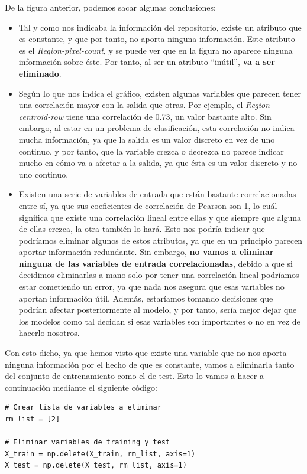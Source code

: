 \documentclass[11pt,a4paper]{article}
\begin{document}
De la figura anterior, podemos sacar algunas conclusiones:

\begin{itemize}[label=\textbullet]
    \item Tal y como nos indicaba la información del repositorio, existe un atributo que es constante, y que por tanto, no aporta
    ninguna información. Este atributo es el \textit{Region-pixel-count}, y se puede ver que en la figura no aparece ninguna
    información sobre éste. Por tanto, al ser un atributo ``inútil'', \textbf{va a ser eliminado}.
    \item Según lo que nos indica el gráfico, existen algunas variables que parecen tener una correlación mayor con la salida que
    otras. Por ejemplo, el \textit{Region-centroid-row} tiene una correlación de 0.73, un valor bastante alto. Sin embargo, al estar
    en un problema de clasificación, esta correlación no indica mucha información, ya que la salida es un valor discreto en vez de
    uno continuo, y por tanto, que la variable crezca o decrezca no parece indicar mucho en cómo va a afectar a la salida, ya que ésta
    es un valor discreto y no uno continuo.
    \item Existen una serie de variables de entrada que están bastante correlacionadas entre sí, ya que sus coeficientes de correlación de
    Pearson son 1, lo cuál significa que existe una correlación lineal entre ellas y que siempre que alguna de ellas crezca, la otra también
    lo hará. Esto nos podría indicar que podríamos eliminar algunos de estos atributos, ya que en un principio parecen aportar información
    redundante. Sin embargo, \textbf{no vamos a eliminar ninguna de las variables de entrada correlacionadas}, debido a que si decidimos
    eliminarlas a mano solo por tener una correlación lineal podríamos estar cometiendo un error, ya que nada nos asegura que esas variables
    no aportan información útil. Además, estaríamos tomando decisiones que podrían afectar posteriormente al modelo, y por tanto, sería
    mejor dejar que los modelos como tal decidan si esas variables son importantes o no en vez de hacerlo nosotros.
\end{itemize}

Con esto dicho, ya que hemos visto que existe una variable que no nos aporta ninguna información por el hecho de que es constante, vamos
a eliminarla tanto del conjunto de entrenamiento como el de test. Esto lo vamos a hacer a continuación mediante el siguiente código:

\begin{lstlisting}
# Crear lista de variables a eliminar
rm_list = [2]

# Eliminar variables de training y test
X_train = np.delete(X_train, rm_list, axis=1)
X_test = np.delete(X_test, rm_list, axis=1)
\end{lstlisting}
\end{document}
